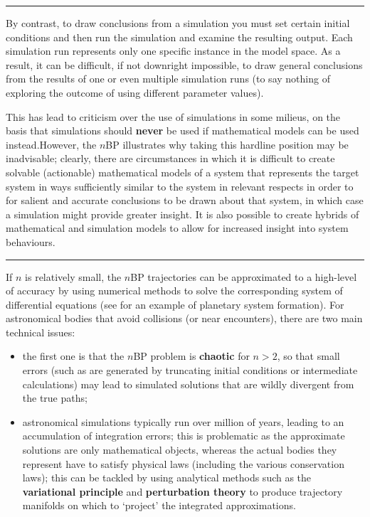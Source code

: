 \begin{center}\rule{0.5\linewidth}{.4pt}\end{center}
By contrast, to draw conclusions from a simulation you must set certain initial conditions and then run the simulation and examine the resulting output. Each simulation run represents only one specific instance in the model space. As a result, it can be difficult, if not downright impossible, to draw general conclusions from the results of one or even multiple simulation runs (to say nothing of exploring the outcome of using different parameter values). \par This has lead to criticism over the use of simulations in some milieus, on the basis that simulations should \textbf{never} be used if mathematical models can be used instead.\newl  However, the $n$BP illustrates why taking this hardline position may be inadvisable; clearly, there are   circumstances in which it is difficult to create solvable (actionable) mathematical models of a system that represents the target system in ways sufficiently similar to the system in relevant respects in order to for salient and accurate conclusions to be drawn about that system, in which case a simulation might provide greater insight. It is also possible to create hybrids of mathematical and simulation models to allow for increased insight into system behaviours.
\begin{center}\rule{0.5\linewidth}{.4pt}\end{center}
If $n$ is relatively small, the $n$BP trajectories can be approximated to a high-level of accuracy by using numerical methods to solve the corresponding system of differential equations (see \cite{SIM_NBODY1} for an example of planetary system formation). For astronomical bodies that avoid collisions (or near encounters), there are two main technical issues:
\begin{itemize}[noitemsep]
\item the first one is that the $n$BP problem is \textbf{chaotic} for $n>2$, so that small errors (such as are generated by truncating initial conditions or intermediate calculations) may lead to simulated solutions that are wildly divergent from the true paths; \item astronomical simulations typically run over million of years, leading to an accumulation of integration errors; this is problematic as the approximate solutions are only mathematical objects, whereas the actual bodies they represent have to satisfy physical laws (including the various conservation laws); this can be tackled by using analytical methods such as the \textbf{variational principle} and \textbf{perturbation theory} to  produce trajectory manifolds on which to `project' the integrated approximations.  
\end{itemize}
